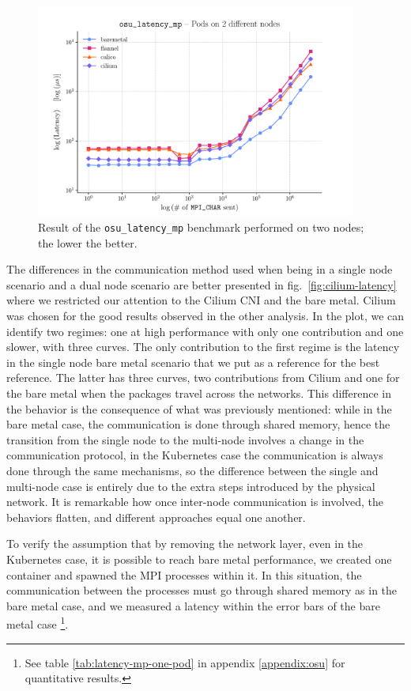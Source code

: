 \begin{figure}
  \centering
  \includegraphics[width=0.94\textwidth]{img/chpt3/latency_mp-2-nodes}
  \caption{Result of the \texttt{osu\_latency\_mp} benchmark performed on two
    nodes; the lower the better.}
  \label{fig:latency-mp-2-nodes}
\end{figure}

The differences in the communication method used when being in a single node
scenario and a dual node scenario are better presented in
fig.~\ref{fig:cilium-latency} where we restricted our attention to the Cilium
CNI and the bare metal.
Cilium was chosen for the good results observed in the other analysis.
In the plot, we can identify two regimes: one at high performance with only one
contribution and one slower, with three curves.
The only contribution to the first regime is the latency in the single node bare
metal scenario that we put as a reference for the best reference.
The latter has three curves, two contributions from Cilium and one for the bare
metal when the packages travel across the networks.
This difference in the behavior is the consequence of what was previously
mentioned: while in the bare metal case, the communication is done through
shared memory, hence the transition from the single node to the multi-node
involves a change in the communication protocol, in the Kubernetes case the
communication is always done through the same mechanisms, so the difference
between the single and multi-node case is entirely due to the extra steps
introduced by the physical network.
It is remarkable how once inter-node communication is involved, the behaviors
flatten, and different approaches equal one another.

To verify the assumption that by removing the network layer, even in the
Kubernetes case, it is possible to reach bare metal performance, we created one
container and spawned the MPI processes within it.
In this situation, the communication between the processes must go through
shared memory as in the bare metal case, and we measured a latency within the
error bars of the bare metal case \footnote{
  See table \ref{tab:latency-mp-one-pod} in appendix \ref{appendix:osu} for
  quantitative results.}.

